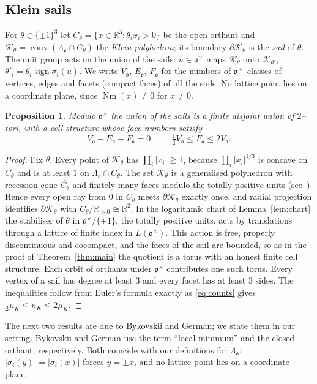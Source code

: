 \documentclass[11pt,reqno]{amsart}
\theoremstyle{plain}
\newtheorem{proposition}[theorem]{Proposition}
\theoremstyle{definition}
\newcommand{\R}{\mathbb{R}}
\newcommand{\Nm}{\operatorname{Nm}}
\newcommand{\conv}{\operatorname{conv}}
\newcommand{\Ok}{\mathfrak{o}}
\newcommand{\bdy}{\partial}
\newcommand{\nK}{n_K}
\newcommand{\muK}{\mu_K}
\begin{document}
\subsection{Klein sails}
For $\theta\in\{\pm1\}^3$ let $C_\theta=\{x\in\R^3:\theta_ix_i>0\}$ be the open orthant and
$\mathcal K_\theta=\conv(\Lambda_\Ok\cap C_\theta)$ the \emph{Klein polyhedron}; its boundary $\bdy\mathcal K_\theta$
is the \emph{sail} of $\theta$. The unit group acts on the union of the sails: $u\in\Ok^\times$ maps
$\mathcal K_\theta$ onto $\mathcal K_{\theta'}$, $\theta'_i=\theta_i\operatorname{sign}\sigma_i(u)$. We write
$V_\Ok$, $E_\Ok$, $F_\Ok$ for the numbers of $\Ok^\times$--classes of vertices, edges and facets (compact
faces) of all the sails. No lattice point lies on a coordinate plane, since $\Nm(x)\ne0$ for $x\ne0$.

\begin{proposition}\label{prop:sailtorus}
Modulo $\Ok^\times$ the union of the sails is a finite disjoint union of $2$--tori, with a cell structure
whose face numbers satisfy
\[
V_\Ok-E_\Ok+F_\Ok=0,\qquad \tfrac12V_\Ok\le F_\Ok\le2V_\Ok .
\]
\end{proposition}

\begin{proof}
Fix $\theta$. Every point of $\mathcal K_\theta$ has $\prod_i|x_i|\ge1$, because $\prod_i|x_i|^{1/3}$ is
concave on $C_\theta$ and is at least $1$ on $\Lambda_\Ok\cap C_\theta$. The set $\mathcal K_\theta$ is a
generalised polyhedron with recession cone $\overline{C_\theta}$ and finitely many faces modulo the
totally positive units (see~\cite{Karpenkov}). Hence every open ray from $0$ in $C_\theta$
meets $\bdy\mathcal K_\theta$ exactly once, and radial projection identifies $\bdy\mathcal K_\theta$ with
$C_\theta/\R_{>0}\cong\R^2$. In the logarithmic chart of Lemma~\ref{lem:chart} the stabiliser of $\theta$ in
$\Ok^\times/\{\pm1\}$, the totally positive units, acts by translations through a lattice of finite index in
$L(\Ok^\times)$. This action is free, properly discontinuous and cocompact, and the faces of the sail are
bounded, so as in the proof of Theorem~\ref{thm:main} the quotient is a torus with an honest finite cell
structure. Each orbit of orthants under $\Ok^\times$ contributes one such torus. Every vertex of a sail has
degree at least $3$ and every facet has at least $3$ sides. The inequalities follow from Euler's formula
exactly as \eqref{eq:counts} gives $\tfrac12\muK\le\nK\le2\muK$.
\end{proof}

The next two results are due to Bykovskii and German; we state them in our setting. Bykovskii and German
use the term ``local minimum'' and the closed orthant, respectively. Both coincide with our definitions for
$\Lambda_\Ok$: $|\sigma_i(y)|=|\sigma_i(x)|$ forces $y=\pm x$, and no lattice point lies on a coordinate
plane.
\end{document}
